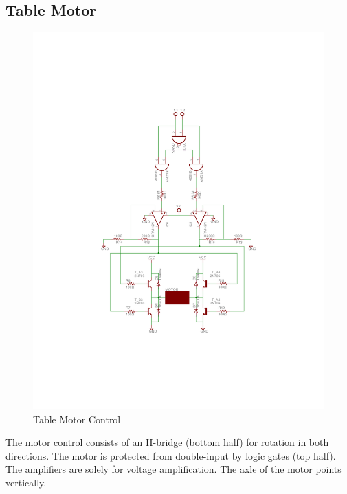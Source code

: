 \documentclass[a4paper, 11pt]{article}
\begin{document}
	\subsection{Table Motor}
	\begin{figure}[!ht]
		\centering
		\vspace{-4cm}
		\includegraphics[scale=.8]{report-images/bidirectional-motor-driver}
		\vspace{-4cm}
		\caption{Table Motor Control}
	\end{figure}
	\noindent The motor control consists of an H-bridge (bottom half) for rotation in both directions.  The motor is protected from double-input by logic gates (top half).  The amplifiers are solely for voltage amplification.  The axle of the motor points vertically.
\newpage
\end{document}
